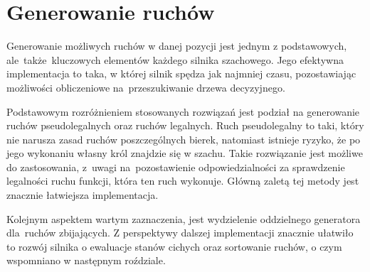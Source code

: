 \section{Generowanie ruchów}
\label{sec:generowanie-ruchow}

Generowanie możliwych ruchów w danej pozycji jest jednym z podstawowych, ale~także~kluczowych elementów każdego silnika szachowego.
Jego efektywna implementacja to taka, w której silnik spędza jak najmniej czasu, pozostawiając możliwości obliczeniowe na~przeszukiwanie drzewa decyzyjnego.

Podstawowym rozróżnieniem stosowanych rozwiązań jest podział na generowanie ruchów pseudolegalnych oraz ruchów legalnych. \cite*{wiki-movegen}
Ruch pseudolegalny to taki, który nie narusza zasad ruchów poszczególnych bierek, natomiast istnieje ryzyko, że po jego wykonaniu własny król znajdzie się w szachu.
Takie rozwiązanie jest możliwe do zastosowania, z~uwagi na~pozostawienie odpowiedzialności za sprawdzenie legalności ruchu funkcji, która ten ruch wykonuje.
Główną zaletą tej metody jest znacznie łatwiejsza implementacja.

Kolejnym aspektem wartym zaznaczenia, jest wydzielenie oddzielnego generatora dla~ruchów zbijających.
Z perspektywy dalszej implementacji znacznie ułatwiło to rozwój silnika o ewaluacje stanów cichych oraz sortowanie ruchów, o czym wspomniano w następnym roździale.





